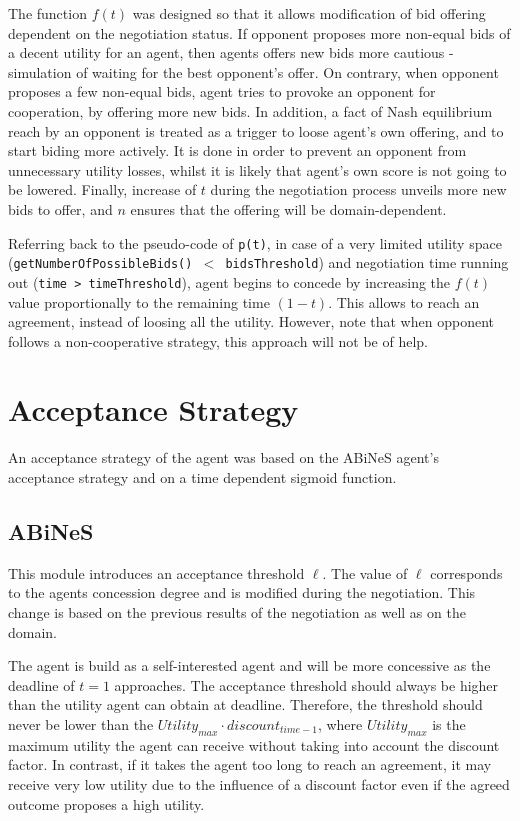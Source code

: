 \documentclass[html]{report}    %
\begin{document}
The function $f(t)$ was designed so that it allows modification of bid offering dependent on the negotiation status. If opponent proposes more non-equal bids of a decent utility for an agent, then agents offers new bids more cautious - simulation of waiting for the best opponent's offer. On contrary, when opponent proposes a few non-equal bids, agent tries to provoke an opponent for cooperation, by offering more new bids. In addition, a fact of Nash equilibrium reach by an opponent is treated as a trigger to loose agent's own offering, and to start biding more actively. It is done in order to prevent an opponent from unnecessary utility losses, whilst it is likely that agent's own score is not going to be lowered. Finally, increase of $t$ during the negotiation process unveils more new bids to offer, and $n$ ensures that the offering will be domain-dependent.

Referring back to the pseudo-code of \texttt{p(t)}, in case of a very limited utility space (\texttt{getNumberOfPossibleBids()~$<$~bidsThreshold}) and negotiation time running out (\texttt{time > timeThreshold}), agent begins to concede by increasing the $f(t)$ value proportionally to the remaining time $(1-t)$. This allows to reach an agreement, instead of loosing all the utility. However, note that when opponent follows a non-cooperative strategy, this approach will not be of help.                

\section{Acceptance Strategy}
              
An acceptance strategy of the agent was based on the ABiNeS agent's ~\cite{abines} acceptance strategy and on a time dependent sigmoid function. 

\subsection{ABiNeS}
This module introduces an acceptance threshold $\ell$. The value of $\ell$ corresponds to the agents concession degree and is modified during the negotiation. This change is based on the previous results of the negotiation as well as on the domain.

The agent is build as a self-interested agent and will be more concessive as the deadline of $t=1$ approaches. The acceptance threshold should always be higher than the utility agent can obtain at deadline. Therefore, the threshold should never be lower than the \(Utility_{max}\cdot discount_{time-1}\), where \( Utility_{max}\) is the maximum utility the agent can receive without taking into account the discount factor. In contrast, if it takes the agent too long to reach an agreement, it may receive very low utility due to the influence of a discount factor even if the agreed outcome proposes a high utility. 
\end{document}
